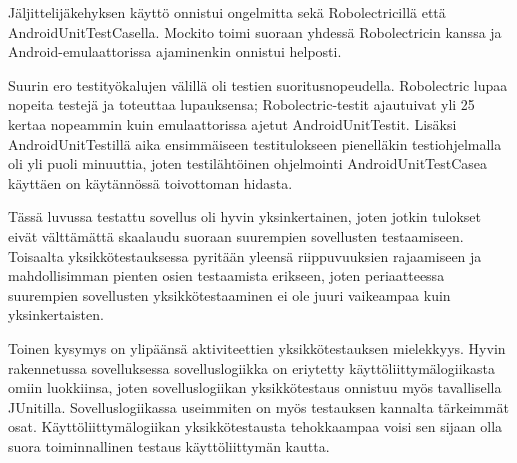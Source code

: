 Jäljittelijäkehyksen käyttö onnistui ongelmitta sekä Robolectricillä että AndroidUnitTestCasella. Mockito toimi suoraan yhdessä Robolectricin kanssa ja Android-emulaattorissa ajaminenkin onnistui helposti.

Suurin ero testityökalujen välillä oli testien suoritusnopeudella. Robolectric lupaa nopeita testejä ja toteuttaa lupauksensa; Robolectric-testit ajautuivat yli 25 kertaa nopeammin kuin emulaattorissa ajetut AndroidUnitTestit. Lisäksi AndroidUnitTestillä aika ensimmäiseen testitulokseen pienelläkin testiohjelmalla oli yli puoli minuuttia, joten testilähtöinen ohjelmointi AndroidUnitTestCasea käyttäen on käytännössä toivottoman hidasta.

Tässä luvussa testattu sovellus oli hyvin yksinkertainen, joten jotkin tulokset eivät välttämättä skaalaudu suoraan suurempien sovellusten testaamiseen. Toisaalta yksikkötestauksessa pyritään yleensä riippuvuuksien rajaamiseen ja mahdollisimman pienten osien testaamista erikseen, joten periaatteessa suurempien sovellusten yksikkötestaaminen ei ole juuri vaikeampaa kuin yksinkertaisten. 

Toinen kysymys on ylipäänsä aktiviteettien yksikkötestauksen mielekkyys. Hyvin rakennetussa sovelluksessa sovelluslogiikka on eriytetty käyttöliittymälogiikasta omiin luokkiinsa, joten sovelluslogiikan yksikkötestaus onnistuu myös tavallisella JUnitilla. Sovelluslogiikassa useimmiten on myös testauksen kannalta tärkeimmät osat. Käyttöliittymälogiikan yksikkötestausta tehokkaampaa voisi sen sijaan olla suora toiminnallinen testaus käyttöliittymän kautta.